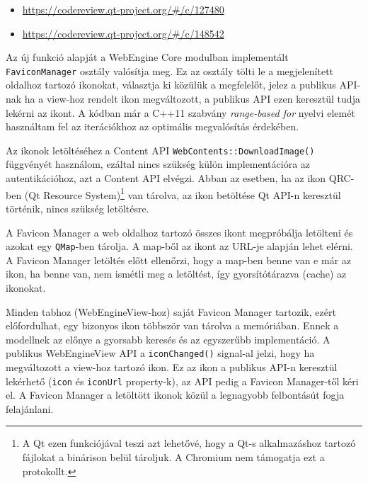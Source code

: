 \documentclass[12pt]{report}
\let\origurl\url
\renewcommand{\url}[1]{%
    \textcolor{blue}{\origurl{#1}}
}
\newcommand{\gerrit}[1]{%
    \textcolor{qtgreen}{\origurl{https://codereview.qt-project.org/\#/c/#1}}
}
\begin{document}
\begin{center}
    \begin{reviewbox}
        \begin{itemize}
            \renewcommand{\labelitemi}{\textcolor{qtgreen}{$\blacktriangleright$}}
            \item \gerrit{127480}
            \item \gerrit{148542}
        \end{itemize}
    \end{reviewbox}
\end{center}

Az új funkció alapját a WebEngine Core modulban implementált \texttt{FaviconManager} osztály
valósítja meg. Ez az osztály tölti le a megjelenített oldalhoz tartozó ikonokat,
választja ki közülük a megfelelőt, jelez a publikus API-nak ha a view-hoz rendelt ikon
megváltozott, a publikus API ezen keresztül tudja lekérni az ikont.
A kódban már a C++11 szabvány \textit{range-based for} nyelvi elemét használtam fel az
iterációkhoz az optimális megvalósítás érdekében.

Az ikonok letöltéséhez a Content API \texttt{WebContents::DownloadImage()} \\
függvényét használom, ezáltal nincs szükség külön implementációra az autentikációhoz, azt a
Content API elvégzi. Abban az esetben, ha az ikon QRC-ben (Qt Resource System)\footnote{A Qt
    ezen funkciójával teszi azt lehetővé, hogy a Qt-s alkalmazáshoz tartozó fájlokat a
    binárison belül tároljuk. A Chromium nem támogatja ezt a protokollt.}
van tárolva, az ikon betöltése Qt API-n keresztül történik, nincs szükség letöltésre.

A Favicon Manager a web oldalhoz tartozó összes ikont megpróbálja letölteni és azokat egy
\texttt{QMap}-ben tárolja. A map-ből az ikont az URL-je alapján lehet elérni. A Favicon
Manager letöltés előtt ellenőrzi, hogy a map-ben benne van e már az ikon, ha benne van,
nem ismétli meg a letöltést, így gyorsítótárazva (cache) az ikonokat.

Minden tabhoz (WebEngineView-hoz) saját Favicon Manager tartozik, ezért előfordulhat, egy
bizonyos ikon többször van tárolva a memóriában. Ennek a modellnek az előnye a gyorsabb
keresés és az egyszerűbb implementáció. A publikus WebEngineView API a
\texttt{iconChanged()} signal-al jelzi, hogy ha megváltozott a view-hoz tartozó ikon.
Ez az ikon a publikus API-n keresztül lekérhető (\texttt{icon} és \texttt{iconUrl}
property-k), az API pedig a Favicon Manager-től kéri el.
A Favicon Manager a letöltött ikonok közül a legnagyobb felbontásút fogja felajánlani.
\end{document}
